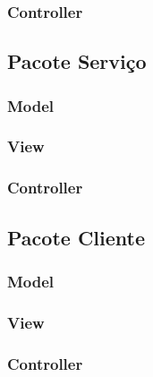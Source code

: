 \subsubsection{Controller}
%

\subsection{Pacote Serviço}

\subsubsection{Model}


\subsubsection{View}



\subsubsection{Controller}
%

\subsection{Pacote Cliente}

\subsubsection{Model}


\subsubsection{View}



\subsubsection{Controller}
%

%